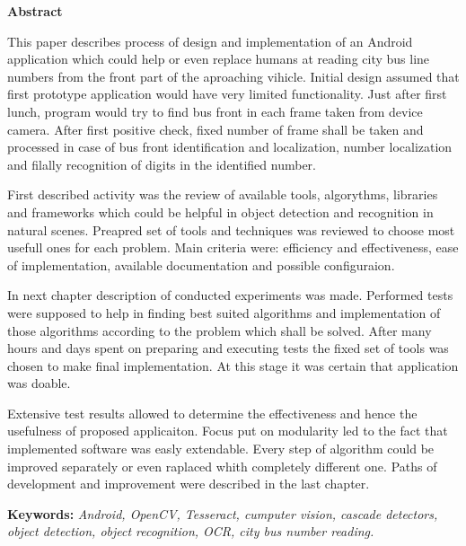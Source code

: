 \begin{center}
	\textbf{Abstract}
\end{center}

This paper describes process of design and implementation
of an Android application which could help or even replace 
humans at reading city bus line numbers from the front 
part of the aproaching vihicle. Initial design assumed
that first prototype application would have very limited functionality.
Just after first lunch, program would try to find bus front 
in each frame taken from device camera. After first positive
check, fixed number of frame shall be taken and processed
in case of bus front identification and localization, number
localization and filally recognition of digits in the identified number.

First described activity was the review of available tools, algorythms,
libraries and frameworks which could be helpful in object
detection and recognition in natural scenes. Preapred set of
tools and techniques was reviewed to choose most usefull ones
for each problem. Main criteria were: efficiency and effectiveness,
ease of implementation,
available documentation and possible configuraion.

In next chapter description of conducted experiments was made.
Performed tests were supposed to help in finding 
best suited algorithms and implementation of those
algorithms according to the problem which shall be solved.
After many hours and days spent on preparing and
executing tests the fixed set of tools was chosen 
to make final implementation. At this stage it was 
certain that application was doable.

Extensive test results allowed to determine the effectiveness
and hence the usefulness of proposed applicaiton.
Focus put on modularity led to the fact that implemented
software was easly extendable. Every step of algorithm 
could be improved separately or even raplaced whith completely
different one. Paths of development and improvement
were described in the last chapter.

\vspace*{\baselineskip}
\noindent\textbf{Keywords:} \textit{Android, OpenCV, Tesseract,
	cumputer vision, cascade detectors, 
	object detection, object recognition,
	OCR, city bus number reading.}

\setcounter{page}{2}
